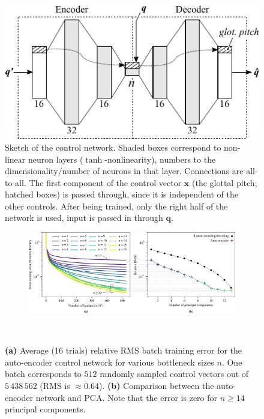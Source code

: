 \documentclass[letterpaper,10pt,conference]{ieeeconf}
\renewcommand{\vec}[1]{\bm{#1}}
\begin{document}
\begin{figure}
	\centering
	\includegraphics{media/control_network.pdf}
	\caption{Sketch of the control network. Shaded boxes correspond to non-linear neuron layers ($\tanh$-nonlinearity), numbers to the dimensionality/number of neurons in that layer. Connections are all-to-all. The first component of the control vector $\vec x$ (the glottal pitch; hatched boxes) is passed through, since it is independent of the other controls. After being trained, only the right half of the network is used, input is passed in through $\vec{q}$.}
	\label{fig:control_network}
\end{figure}

\begin{figure}[p]
	\begin{subfigure}[t]{\textwidth}
		\centering
		\includegraphics[scale=0.825]{media/control_network_training_pca.pdf}
		\label{fig:control_network_training}
	\end{subfigure}
	\begin{subfigure}[t]{0\textwidth}
		~
		\label{fig:control_network_pca}
	\end{subfigure}
	\caption{\textbf{(a)} Average (16 trials) relative RMS batch training error for the auto-encoder control network for various bottleneck sizes $n$. One batch corresponds to $512$ randomly sampled control vectors out of $5\,438\,562$ (RMS is $\approx 0.64$). \textbf{(b)} Comparison between the auto-encoder network and PCA. Note that the error is zero for $n \geq 14$ principal components.}
\end{figure}
\end{document}
